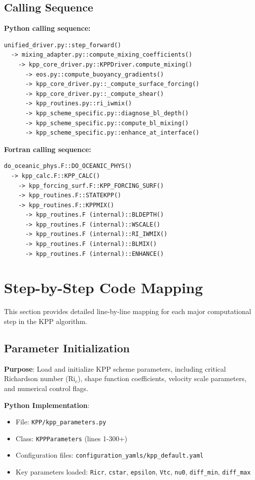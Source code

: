 \documentclass[11pt]{article}
\begin{document}
\subsection{Calling Sequence}

\textbf{Python calling sequence:}
\begin{verbatim}
unified_driver.py::step_forward()
  -> mixing_adapter.py::compute_mixing_coefficients()
    -> kpp_core_driver.py::KPPDriver.compute_mixing()
      -> eos.py::compute_buoyancy_gradients()
      -> kpp_core_driver.py::_compute_surface_forcing()
      -> kpp_core_driver.py::_compute_shear()
      -> kpp_routines.py::ri_iwmix()
      -> kpp_scheme_specific.py::diagnose_bl_depth()
      -> kpp_scheme_specific.py::compute_bl_mixing()
      -> kpp_scheme_specific.py::enhance_at_interface()
\end{verbatim}

\textbf{Fortran calling sequence:}
\begin{verbatim}
do_oceanic_phys.F::DO_OCEANIC_PHYS()
  -> kpp_calc.F::KPP_CALC()
    -> kpp_forcing_surf.F::KPP_FORCING_SURF()
    -> kpp_routines.F::STATEKPP()
    -> kpp_routines.F::KPPMIX()
      -> kpp_routines.F (internal)::BLDEPTH()
      -> kpp_routines.F (internal)::WSCALE()
      -> kpp_routines.F (internal)::RI_IWMIX()
      -> kpp_routines.F (internal)::BLMIX()
      -> kpp_routines.F (internal)::ENHANCE()
\end{verbatim}

\section{Step-by-Step Code Mapping}
\label{sec:mapping}

This section provides detailed line-by-line mapping for each major computational step in the KPP algorithm.

\subsection{Parameter Initialization}

\textbf{Purpose}: Load and initialize KPP scheme parameters, including critical Richardson number (Ri$_c$), shape function coefficients, velocity scale parameters, and numerical control flags.

\textbf{Python Implementation}:
\begin{itemize}
    \item File: \verb|KPP/kpp_parameters.py|
    \item Class: \verb|KPPParameters| (lines 1-300+)
    \item Configuration files: \verb|configuration_yamls/kpp_default.yaml|
    \item Key parameters loaded: \verb|Ricr|, \verb|cstar|, \verb|epsilon|, \verb|Vtc|, \verb|nu0|, \verb|diff_min|, \verb|diff_max|
\end{itemize}
\end{document}
